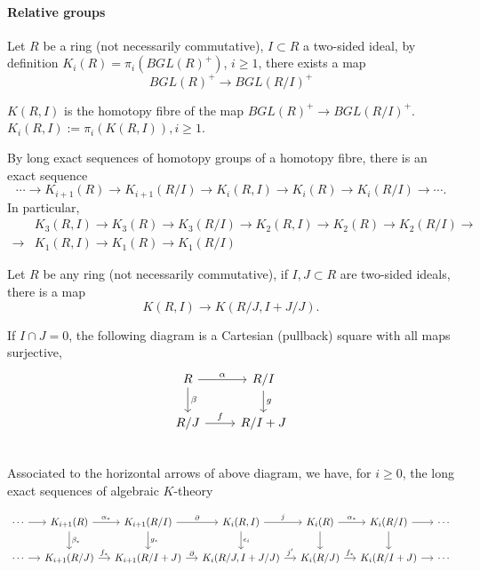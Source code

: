 \paragraph{Relative groups} %
\label{par:relative_groups}
Let $R$ be a ring (not necessarily commutative), $I\subset R$ a two-sided ideal, by definition $K_i(R)=\pi_i(BGL(R)^+)$, $i\geq 1$, there exists a map
\[BGL(R)^+ \longrightarrow BGL(R/I)^+\]
\begin{definition}
	$K(R,I)$ is the homotopy fibre of the map $BGL(R)^+ \longrightarrow BGL(R/I)^+$. $K_i(R,I):=\pi_i(K(R,I)), i\geq 1$.
\end{definition}

By long exact sequences of homotopy groups of a homotopy fibre, there is an exact sequence
\[\cdots \longrightarrow K_{i+1}(R)\longrightarrow K_{i+1}(R/I) \longrightarrow K_i(R,I)\longrightarrow K_i(R)\longrightarrow K_i(R/I)\longrightarrow \cdots.\]
In particular,
\begin{align*}
&K_3(R,I)\longrightarrow K_3(R)\longrightarrow K_3(R/I) \longrightarrow K_2(R,I)\longrightarrow K_2(R)\longrightarrow K_2(R/I)\longrightarrow\\
\longrightarrow & K_1(R,I)\longrightarrow K_1(R)\longrightarrow K_1(R/I)
\end{align*}

Let $R$ be any ring (not necessarily commutative), if $I,J\subset R$ are two-sided ideals, there is a map
\[K(R,I)\longrightarrow K(R/J,I+J/J).\]

If $I\cap J =0$, the following diagram is a Cartesian (pullback) square with all maps surjective,
	\[\begin{tikzcd}
		R \ar[r,"\alpha"] \ar[d,"\beta"]& R/I\ar[d,"g"]\\
		R/J \ar[r,"f"] & R/I+J\\
	\end{tikzcd}\]
Associated to the horizontal arrows of above diagram, we have, for $i \geq 0$, the long exact sequences of algebraic $K$-theory 

\begin{equation}
\label{cdrelativeladder}
\begin{tikzcd}[column sep=small]
		\cdots  \ar[r]& K_{i+1}(R)\ar[r,"\alpha_*"] \ar[d,"\beta_*"]& K_{i+1}(R/I) \ar[r,"\partial"] \ar[d,"g_*"] &K_{i}(R,I) \ar[r,"j"] \ar[d,"\epsilon_i"] &K_{i}(R) \ar[r,"\alpha_*"] \ar[d] & K_{i}(R/I) \ar[r] \ar[d] & \cdots\\
		\cdots  \ar[r]& K_{i+1}(R/J)\ar[r,"f_*"] & K_{i+1}(R/I+J) \ar[r,"\partial"]  &K_{i}(R/J,I+J/J) \ar[r,"j'"]  &K_{i}(R/J) \ar[r,"f_*"]  & K_{i}(R/I+J) \ar[r]  & \cdots\\
	\end{tikzcd}
\end{equation}

